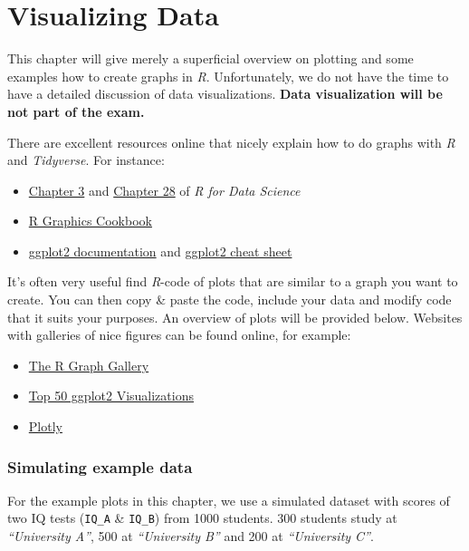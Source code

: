 \documentclass[
]{scrartcl}
\providecommand{\tightlist}{%
  \setlength{\itemsep}{0pt}\setlength{\parskip}{0pt}}
\begin{document}
\section{Visualizing Data}\label{visualizing-data}

This chapter will give merely a superficial overview on plotting and some examples how to create graphs in \emph{R}. Unfortunately, we do not have the time to have a detailed discussion of data visualizations. \textbf{Data visualization will be not part of the exam.}

There are excellent resources online that nicely explain how to do graphs with \emph{R} and \emph{Tidyverse}. For instance:

\begin{itemize}
\tightlist
\item
  \href{http://r4ds.had.co.nz/data-visualisation.html}{Chapter 3} and \href{Chapter\%2028:\%20Graphics\%20for\%20communication}{Chapter 28} of \emph{R for Data Science}
\item
  \href{http://www.cookbook-r.com/Graphs/}{R Graphics Cookbook}
\item
  \href{https://ggplot2.tidyverse.org/reference/}{ggplot2 documentation} and \hyperref[cheatsheets]{ggplot2 cheat sheet}
\end{itemize}

It's often very useful find \emph{R}-code of plots that are similar to a graph you want to create. You can then copy \& paste the code, include your data and modify code that it suits your purposes. An overview of plots will be provided below. Websites with galleries of nice figures can be found online, for example:

\begin{itemize}
\tightlist
\item
  \href{http://www.r-graph-gallery.com/}{The R Graph Gallery}
\item
  \href{http://r-statistics.co/Top50-Ggplot2-Visualizations-MasterList-R-Code.html}{Top 50 ggplot2 Visualizations}
\item
  \href{https://plotly.com/ggplot2/}{Plotly}
\end{itemize}

\subsubsection*{Simulating example data}\label{simulating-example-data}

For the example plots in this chapter, we use a simulated dataset with scores of two IQ tests (\texttt{IQ\_A} \& \texttt{IQ\_B}) from 1000 students. 300 students study at \emph{``University A''}, 500 at \emph{``University B''} and 200 at \emph{``University C''}.
\end{document}
